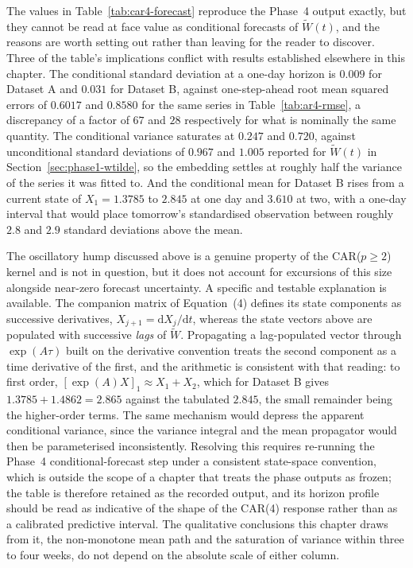 \documentclass[11pt, a4paper, twoside]{article}
\begin{document}
The values in Table~\ref{tab:car4-forecast} reproduce the Phase~4 output exactly, but they cannot be read at face value as conditional forecasts of $\widetilde W(t)$, and the reasons are worth setting out rather than leaving for the reader to discover. Three of the table's implications conflict with results established elsewhere in this chapter. The conditional standard deviation at a one-day horizon is $0.009$ for Dataset A and $0.031$ for Dataset B, against one-step-ahead root mean squared errors of $0.6017$ and $0.8580$ for the same series in Table~\ref{tab:ar4-rmse}, a discrepancy of a factor of $67$ and $28$ respectively for what is nominally the same quantity. The conditional variance saturates at $0.247$ and $0.720$, against unconditional standard deviations of $0.967$ and $1.005$ reported for $\widetilde W(t)$ in Section~\ref{sec:phase1-wtilde}, so the embedding settles at roughly half the variance of the series it was fitted to. And the conditional mean for Dataset B rises from a current state of $X_1 = 1.3785$ to $2.845$ at one day and $3.610$ at two, with a one-day interval that would place tomorrow's standardised observation between roughly $2.8$ and $2.9$ standard deviations above the mean.

The oscillatory hump discussed above is a genuine property of the CAR($p \geq 2$) kernel and is not in question, but it does not account for excursions of this size alongside near-zero forecast uncertainty. A specific and testable explanation is available. The companion matrix of Equation~(4) defines its state components as successive derivatives, $X_{j+1} = \mathrm dX_j/\mathrm dt$, whereas the state vectors above are populated with successive \emph{lags} of $\widetilde W$. Propagating a lag-populated vector through $\exp(A\tau)$ built on the derivative convention treats the second component as a time derivative of the first, and the arithmetic is consistent with that reading: to first order, $[\exp(A)X]_1 \approx X_1 + X_2$, which for Dataset B gives $1.3785 + 1.4862 = 2.865$ against the tabulated $2.845$, the small remainder being the higher-order terms. The same mechanism would depress the apparent conditional variance, since the variance integral and the mean propagator would then be parameterised inconsistently. Resolving this requires re-running the Phase~4 conditional-forecast step under a consistent state-space convention, which is outside the scope of a chapter that treats the phase outputs as frozen; the table is therefore retained as the recorded output, and its horizon profile should be read as indicative of the shape of the CAR(4) response rather than as a calibrated predictive interval. The qualitative conclusions this chapter draws from it, the non-monotone mean path and the saturation of variance within three to four weeks, do not depend on the absolute scale of either column.
\end{document}
